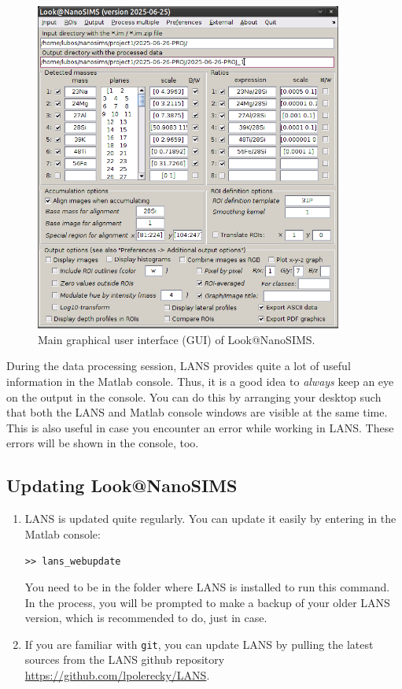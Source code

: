 \documentclass[a4paper, 11pt]{article}
\newcommand{\ttt}[1]{\texttt{#1}}
\newcommand\mnote{\marginnote{\fbox{\textbf{\bf Note}}}}
\begin{document}
\begin{figure}[!t]
\centering
\includegraphics[width=0.9\textwidth]{figs1/LANS-maingui}
\caption{\label{fig1:mainLANSgui}%
Main graphical user interface (GUI) of Look@NanoSIMS.}
\end{figure}

\mnote
During the data processing session, LANS provides quite a lot of useful information in the Matlab console. Thus, it is a good idea to \emph{always} keep an eye on the output in the console. You can do this by arranging your desktop such that both the LANS and Matlab console windows are visible at the same time. This is also useful in case you encounter an error while working in LANS. These errors will be shown in the console, too.



\subsection{Updating Look@NanoSIMS}

\begin{enumerate}
 
\item LANS is updated quite regularly. You can update it easily by entering in the Matlab console:

\ttt{>> lans\_webupdate} 

You need to be in the folder where LANS is installed to run this command. In the process, you will be prompted to make a backup of your older LANS version, which is recommended to do, just in case.

\item If you are familiar with \ttt{git}, you can update LANS by pulling the latest sources from the LANS github repository \url{https://github.com/lpolerecky/LANS}.

\end{enumerate}
\end{document}

